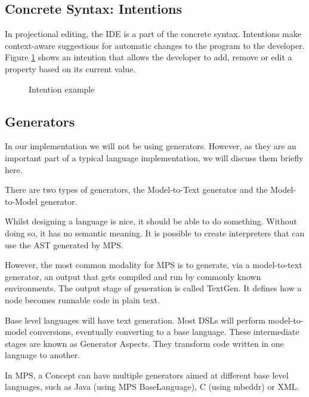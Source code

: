 \subsection{Concrete Syntax: Intentions}

In projectional editing, the IDE is a part of the concrete syntax.
Intentions make context-aware suggestions for automatic changes to the program to the developer.
Figure \ref{fig:intention_example} shows an intention that allows the developer to add, remove or edit a property based on its current value.

\begin{figure}[h]
    \centering
    \caption{Intention example}
    \label{fig:intention_example}
\end{figure}

\subsection{Generators}
In our implementation we will not be using generators.
However, as they are an important part of a typical language implementation, we will discuss them briefly here.

There are two types of generators, the Model-to-Text generator and the Model-to-Model generator.

Whilst designing a language is nice, it should be able to do something. 
Without doing so, it has no semantic meaning.
It is possible to create interpreters that can use the AST generated by MPS.

However, the most common modality for MPS is to generate, via a model-to-text generator, an output that gets compiled and run by commonly known environments.
The output stage of generation is called TextGen.
It defines how a node becomes runnable code in plain text.

Base level languages will have text generation.
Most DSLs will perform model-to-model conversions, eventually converting to a base language.
These intermediate stages are known as Generator Aspects.
They transform code written in one language to another.

In MPS, a Concept can have multiple generators aimed at different base level languages, such as Java (using MPS BaseLanguage), C (using mbeddr) or XML.